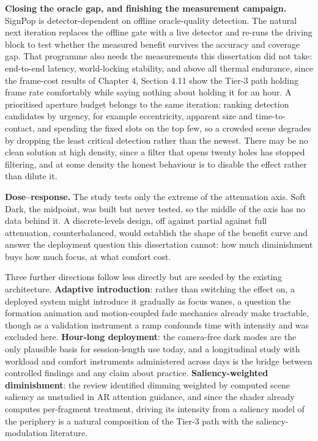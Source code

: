 \textbf{Closing the oracle gap, and finishing the measurement campaign.} SignPop is
detector-dependent on offline oracle-quality detection. The natural next iteration replaces the
offline gate with a live detector and re-runs the driving block to test whether the measured benefit
survives the accuracy and coverage gap. That programme also needs the measurements this dissertation
did not take: end-to-end latency, world-locking stability, and above all thermal endurance, since the
frame-cost results of Chapter 4, Section 4.11 show the Tier-3 path holding frame rate comfortably
while saying nothing about holding it for an hour. A prioritised aperture budget belongs to the same
iteration: ranking detection candidates by urgency, for example eccentricity, apparent size and
time-to-contact, and spending the fixed slots on the top few, so a crowded scene degrades by
dropping the least critical detection rather than the newest. There may be no clean solution at high
density, since a filter that opens twenty holes has stopped filtering, and at some density the
honest behaviour is to disable the effect rather than dilute it.

\textbf{Dose--response.} The study tests only the extreme of the attenuation axis. Soft Dark, the
midpoint, was built but never tested, so the middle of the axis has no data behind it. A
discrete-levels design, off against partial against full attenuation, counterbalanced, would
establish the shape of the benefit curve and answer the deployment question this dissertation cannot:
how much diminishment buys how much focus, at what comfort cost.

Three further directions follow less directly but are seeded by the existing architecture.
\textbf{Adaptive introduction}: rather than switching the effect on, a deployed system might
introduce it gradually as focus wanes, a question the formation animation and motion-coupled fade
mechanics already make tractable, though as a validation instrument a ramp confounds time with
intensity and was excluded here. \textbf{Hour-long deployment}: the camera-free dark modes are the
only plausible basis for session-length use today, and a longitudinal study with workload and comfort
instruments administered across days is the bridge between controlled findings and any claim about
practice. \textbf{Saliency-weighted diminishment}: the review identified dimming weighted by computed
scene saliency as unstudied in AR attention guidance, and since the shader already computes
per-fragment treatment, driving its intensity from a saliency model of the periphery is a natural
composition of the Tier-3 path with the saliency-modulation literature.

